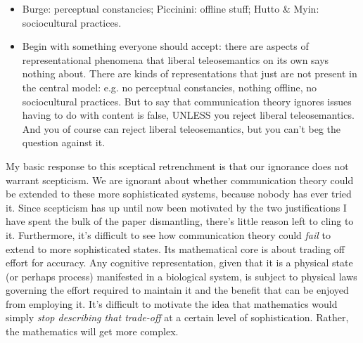 \documentclass[12pt]{article}
\begin{document}
\begin{itemize}
    \item Burge: perceptual constancies; Piccinini: offline stuff; Hutto \& Myin: sociocultural practices.
    \item Begin with something everyone should accept: there are aspects of representational phenomena that liberal teleosemantics on its own says nothing about. There are kinds of representations that just are not present in the central model: e.g. no perceptual constancies, nothing offline, no sociocultural practices. But to say that communication theory ignores issues having to do with content is false, UNLESS you reject liberal teleosemantics. And you of course can reject liberal teleosemantics, but you can't beg the question against it.
\end{itemize}

My basic response to this sceptical retrenchment is that our ignorance does not warrant scepticism.
We are ignorant about whether communication theory could be extended to these more sophisticated systems, because nobody has ever tried it.
Since scepticism has up until now been motivated by the two justifications I have spent the bulk of the paper dismantling, there's little reason left to cling to it.
Furthermore, it's difficult to see how communication theory could \textit{fail} to extend to more sophisticated states.
Its mathematical core is about trading off effort for accuracy.
Any cognitive representation, given that it is a physical state (or perhaps process) manifested in a biological system, is subject to physical laws governing the effort required to maintain it and the benefit that can be enjoyed from employing it.
It's difficult to motivate the idea that mathematics would simply \textit{stop describing that trade-off} at a certain level of sophistication.
Rather, the mathematics will get more complex.

\printbibliography
\end{document}
